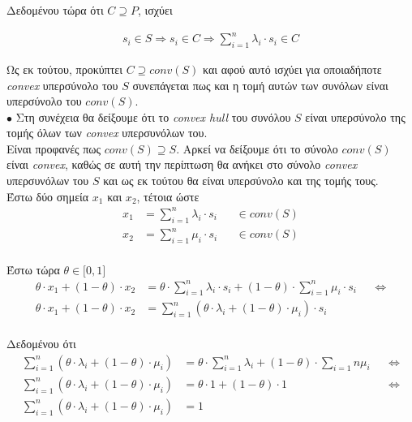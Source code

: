 \documentclass[12pt]{article}
\begin{document}
Δεδομένου τώρα ότι $C \supseteq P$, ισχύει

\begin{align*}
    s_i \in S \Rightarrow s_i \in C \Rightarrow \sum_{i = 1}^{n} λ_i \cdot s_i \in C
\end{align*}

Ως εκ τούτου, προκύπτει $C \supseteq conv(S)$ και αφού αυτό ισχύει για οποιαδήποτε \textit{convex}
υπερσύνολο του $S$ συνεπάγεται πως και η τομή αυτών των συνόλων είναι υπερσύνολο του $conv(S)$.\\

$\bullet$ Στη συνέχεια θα δείξουμε ότι το \textit{convex hull} του συνόλου $S$ είναι υπερσύνολο της
τομής όλων των \textit{convex} υπερσυνόλων του.\\

Είναι προφανές πως $conv(S) \supseteq S$. Αρκεί να δείξουμε ότι το σύνολο $conv(S)$
είναι \textit{convex}, καθώς σε αυτή την περίπτωση θα ανήκει στο σύνολο \textit{convex} υπερσυνόλων του
$S$ και ως εκ τούτου θα είναι υπερσύνολο και της τομής τους.\\

Έστω δύο σημεία $x_1$ και $x_2$, τέτοια ώστε\\

\begin{align*}
    x_1 & = \sum_{i = 1}^{n} λ_i \cdot s_i && \in conv(S) \\
    x_2 & = \sum_{i = 1}^{n} μ_i \cdot s_i && \in conv(S)
\end{align*}\\

Έστω τώρα $\theta \in \lbrack 0, 1 \rbrack$\\

\begin{align*}
    \theta \cdot x_1 + (1 - \theta) \cdot x_2 & = \theta \cdot \sum_{i = 1}^{n} λ_i \cdot s_i + (1 - \theta) \cdot \sum_{i = 1}^{n} μ_i \cdot s_i && \Leftrightarrow \\
    \theta \cdot x_1 + (1 - \theta) \cdot x_2 & = \sum_{i = 1}^{n}(\theta \cdot λ_i + (1 - \theta) \cdot μ_i) \cdot s_i
\end{align*}\\

Δεδομένου ότι\\

\begin{align*}
    \sum_{i = 1}^{n}(\theta \cdot λ_i + (1 - \theta) \cdot μ_i) & = \theta \cdot \sum_{i = 1}^{n} λ_i + (1 - \theta) \cdot \sum_{i = 1}{n} μ_i && \Leftrightarrow \\
    \sum_{i = 1}^{n}(\theta \cdot λ_i + (1 - \theta) \cdot μ_i) & = \theta \cdot 1 + (1 - \theta) \cdot 1 && \Leftrightarrow \\
    \sum_{i = 1}^{n}(\theta \cdot λ_i + (1 - \theta) \cdot μ_i) & = 1
\end{align*}\\
\end{document}

